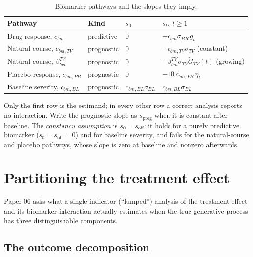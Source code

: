 \documentclass[11pt]{article}
\begin{document}
\begin{table}[h]
\centering\small
\caption{Biomarker pathways and the slopes they imply.}
\label{tab:bp-pathways}
\begin{tabular}{@{}llll@{}}
\toprule
Pathway & Kind & $s_0$ & $s_t$, $t \ge 1$ \\
\midrule
Drug response, $c_{bm}$ & predictive & 0 & $-c_{bm}\sigma_{BR}\,g_t$ \\
Natural course, $c_{bm,TV}$ & prognostic & 0 & $-c_{bm,TV}\sigma_{TV}$ (constant) \\
Natural course, $\beta^{TV}_{bm}$ & prognostic & 0 & $-\beta^{TV}_{bm}\sigma_{TV}\tilde G_{TV}(t)$ (growing) \\
Placebo response, $c_{bm,PB}$ & prognostic & 0 & $-10\,c_{bm,PB}\,\eta_t$ \\
Baseline severity, $c_{bm,BL}$ & prognostic & $c_{bm,BL}\sigma_{BL}$ & $c_{bm,BL}\sigma_{BL}$ \\
\bottomrule
\end{tabular}
\end{table}

\noindent Only the first row is the estimand; in every other row a
correct analysis reports no interaction. Write the prognostic slope as
$s_{\text{prog}}$ when it is constant after baseline. The
\emph{constancy assumption} is $s_0 = s_{\text{off}}$: it holds for a
purely predictive biomarker ($s_0 = s_{\text{off}} = 0$) and for
baseline severity, and fails for the natural-course and placebo
pathways, whose slope is zero at baseline and nonzero afterwards.

\section{Partitioning the treatment effect}
\label{sec:partition}

Paper 06 asks what a single-indicator (``lumped'') analysis of the
treatment effect and its biomarker interaction actually estimates when
the true generative process has three distinguishable components.

\subsection{The outcome decomposition}
\end{document}
